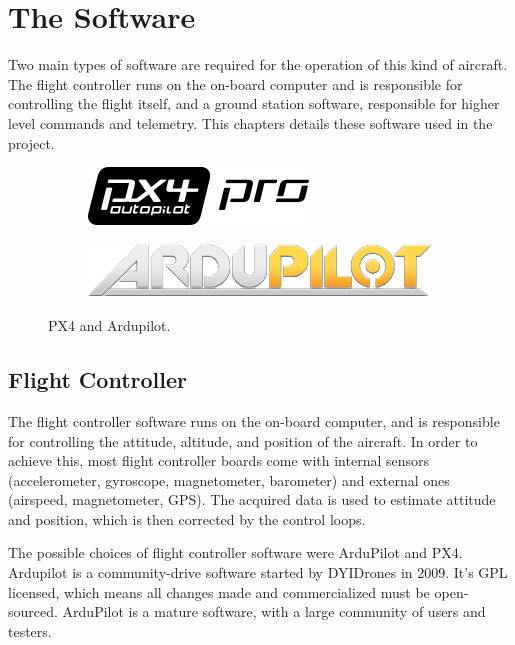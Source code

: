 \chapter{The Software}

Two main types of software are required for the operation of this kind of aircraft. The flight controller runs on the on-board computer and is responsible for controlling the flight itself, and a ground station software, responsible for higher level commands and telemetry.
This chapters details these software used in the project.

\begin{figure}[h]
  \centering
  \begin{subfigure}{.5\textwidth}
    \centering
    \includegraphics[width=\linewidth]{figs/px4.png}
  \end{subfigure}%
  \begin{subfigure}{.5\textwidth}
    \centering
    \includegraphics[width=\linewidth]{figs/ardupilot.png}

  \end{subfigure}
  \caption{PX4 and Ardupilot.}
  \label{fig:motorcurves}
\end{figure}


\section{Flight Controller}
The flight controller software runs on the on-board computer, and is responsible for controlling the attitude, altitude, and position of the aircraft.
%
In order to achieve this, most flight controller boards come with internal sensors (accelerometer, gyroscope, magnetometer, barometer) and external ones (airspeed, magnetometer, GPS). 
%
The acquired data is used to estimate attitude and position, which is then corrected by the control loops.

The possible choices of flight controller software were ArduPilot and PX4.
%
Ardupilot is a community-drive software started by DYIDrones in 2009\cite{diydrones}.
%
It's GPL licensed, which means all changes made and commercialized must be open-sourced\cite{gplv3}.
%
ArduPilot is a mature software, with a large community of users and testers.
%

